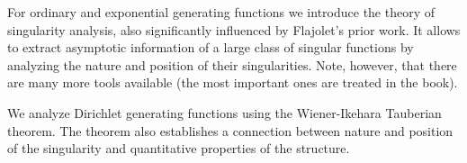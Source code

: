 For ordinary and exponential generating functions we introduce the theory of singularity analysis, also significantly influenced by Flajolet's prior work.
It allows to extract asymptotic information of a large class of singular functions by analyzing the nature and position of their singularities.
Note, however, that there are many more tools available (the most important ones are treated in the book). 

We analyze Dirichlet generating functions using the Wiener-Ikehara Tauberian theorem.
The theorem also establishes a connection between nature and position of the singularity and quantitative properties of the structure.





























